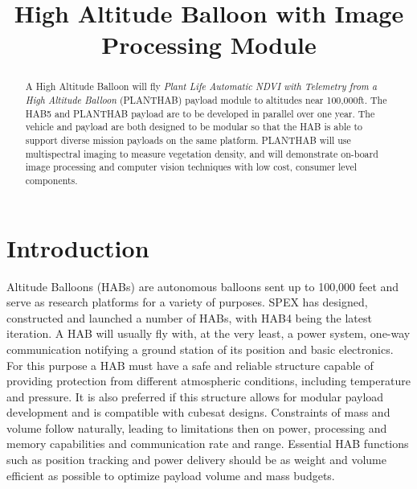 \documentclass[conference]{IEEEtran} %
\title{High Altitude Balloon with Image Processing Module}
\author{
  \IEEEauthorblockN{%
    Keshav~Adhyay\IEEEauthorrefmark{1}
    Philip~Linden\IEEEauthorrefmark{2}
  }
  \IEEEauthorblockA{%
    RIT Space Exploration, Rochester Institute of Technology \\ %
    Rochester, N.Y. \\
    Email:
    \IEEEauthorrefmark{1}keshavadhyay@gmail.com
    \IEEEauthorrefmark{2}pjl7651@rit.edu
  }

}
\begin{document}
\maketitle%

\begin{abstract}
  A High Altitude Balloon will fly \textit{Plant Life Automatic NDVI with Telemetry from a High Altitude Balloon} (PLANTHAB) payload module to altitudes near 100,000ft. 
  The HAB5 and PLANTHAB payload are to be developed in parallel over one year. 
  The vehicle and payload are both designed to be modular so that the HAB is able to support diverse mission payloads on the same platform. 
  PLANTHAB will use multispectral imaging to measure vegetation density, and will demonstrate on-board image processing and computer vision techniques with low cost, consumer level components.

\end{abstract}

\section{Introduction}
 Altitude Balloons (HABs) are autonomous balloons sent up to 100,000 feet and serve as research platforms for a variety of purposes. 
SPEX has designed, constructed and launched a number of HABs, with HAB4 being the latest iteration. 
A HAB will usually fly with, at the very least, a power system, one-way communication notifying a ground station of its position and basic electronics. 
For this purpose a HAB must have a safe and reliable structure capable of providing protection from different atmospheric conditions, including temperature and pressure. 
It is also preferred if this structure allows for modular payload development and is compatible with cubesat designs. 
Constraints of mass and volume follow naturally, leading to limitations then on power, processing and memory capabilities and communication rate and range. 
Essential HAB functions such as position tracking and power delivery should be as weight and volume efficient as possible to optimize payload volume and mass budgets.
\end{document}
